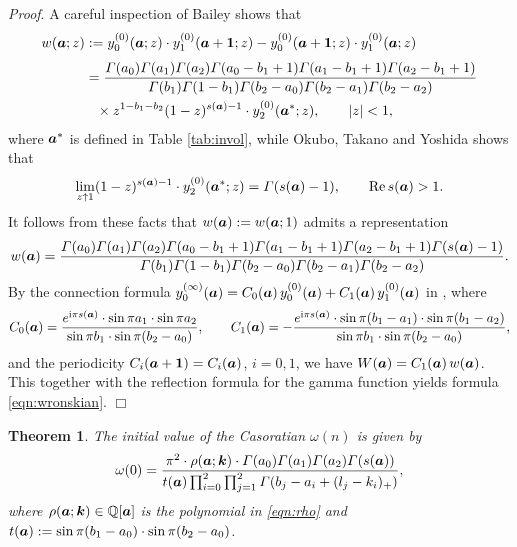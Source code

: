 \documentclass[a4paper,12pt]{article}
\theoremstyle{plain}
\newtheorem{theorem}{Theorem}[section]
\def\rRe{\mathrm{Re}}
\def\Q{\mathbb{Q}}
\def\vG{\varGamma}
\def\ba{\mbox{\boldmath $a$}}
\def\sba{\mbox{\boldmath ${\scriptstyle a}$}}
\def\bk{\mbox{\boldmath $k$}}
\def\1{\mbox{\boldmath $1$}}
\begin{document}
{\it Proof}. 
A careful inspection of Bailey \cite[\S 10.3, formulas (3) and (5)]{Bailey1} shows that 
\begin{align*}
w(\ba; z) 
&:= y_0^{(0)}(\ba; z) \cdot y_1^{(0)}(\ba+\1; z)  
- y_0^{(0)}(\ba+\1; z) \cdot y_1^{(0)}(\ba; z) \\[1mm]
&= \dfrac{\vG(a_0) \vG(a_1) \vG(a_2) \vG(a_0-b_1+1) \vG(a_1-b_1+1) 
\vG(a_2-b_1+1)}{\vG(b_1) \vG(1-b_1) \vG(b_2-a_0)\vG(b_2-a_1) \vG(b_2-a_2)} \\
&\phantom{=} \times z^{1-b_1-b_2}(1-z)^{s(\sba)-1} \cdot y_2^{(0)}(\ba^*; z),  
\qquad |z| < 1,   
\end{align*}
where $\ba^*$ is defined in Table \ref{tab:invol}, 
while Okubo, Takano and Yoshida \cite[Lemma 2]{OTY} shows that 
\[
\lim_{z \uparrow 1} (1-z)^{s(\sba)-1} \cdot y_2^{(0)}(\ba^*; z) = \vG(s(\ba)-1), 
\qquad \rRe \, s(\ba) > 1. 
\]
It follows from these facts that $w(\ba) := w(\ba; 1)$ admits a representation 
\[
w(\ba) = 
\dfrac{\vG(a_0) \vG(a_1) \vG(a_2) \vG(a_0-b_1+1) \vG(a_1-b_1+1) \vG(a_2-b_1+1) 
\vG(s(\ba)-1)}{\vG(b_1) \vG(1-b_1) \vG(b_2-a_0)\vG(b_2-a_1) \vG(b_2-a_2)}.      
\]
By the connection formula 
$y_0^{(\infty)}(\ba) = C_0(\ba) \, y_0^{(0)}(\ba) + C_1(\ba) \, y_1^{(0)}(\ba)$ in 
\cite[formula (16)]{EI}, where    
\[
C_0(\ba) = \dfrac{e^{\mathrm{i} \pi s(\sba)} \cdot 
\sin \pi a_1 \cdot \sin \pi a_2}{\sin \pi b_1 \cdot \sin \pi(b_2-a_0)}, 
\qquad
C_1(\ba) = 
-\dfrac{e^{\mathrm{i} \pi s(\sba)} \cdot 
\sin \pi (b_1-a_1) \cdot \sin \pi (b_1-a_2)}{\sin \pi b_1 \cdot \sin \pi(b_2-a_0)},     
\]
and the periodicity $C_i(\ba+\1) = C_i(\ba)$, $i = 0, 1$, we have  
$W(\ba) = C_1(\ba) \, w(\ba)$. 
This together with  the reflection formula for the gamma function yields 
formula \eqref{eqn:wronskian}. \hfill $\Box$ 
\begin{theorem} \label{thm:casorati} 
The initial value of the Casoratian $\omega(n)$ is given by 
\begin{equation} \label{eqn:casorati} 
\omega(0) = \dfrac{\pi^2 \cdot \rho(\ba; \bk) \cdot \vG(a_0) \vG(a_1) \vG(a_2) 
\vG( s(\ba) ) }{ t(\ba) \prod_{i=0}^2 
\prod_{j=1}^2 \vG(b_j-a_i +(l_j-k_i)_+)}, 
\end{equation}
where $\rho(\ba; \bk) \in \Q[\ba]$ is the polynomial in \eqref{eqn:rho} 
and $t(\ba) := \sin \pi(b_1-a_0) \cdot \sin \pi(b_2-a_0)$.  
\end{theorem}
\end{document}

